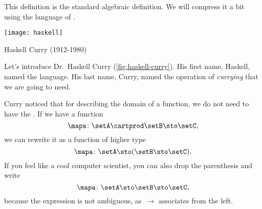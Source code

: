 This definition is the standard algebraic definition.
We will compress it a bit using the language of .

\begin{marginfigure}
    \texttt{[image: haskell]}
    \caption{Haskell Curry (1912-1980)}
    \label{fig:haskell-curry}
\end{marginfigure}

Let's introduce Dr.~Haskell Curry (\cref{fig:haskell-curry}).
His first name, Haskell, named the language.
His last name, Curry, named the operation of \emph{currying} that we are going to need.

Curry noticed that for describing the domain of a function, we do not need to have the .
If we have a function
%
\begin{equation}
    \label{eq:currying-1}
    \mapa \colon \setA \cartprod \setB \sto \setC,
\end{equation}
%
we can rewrite it as a function of higher type
%
\begin{equation}
    \label{eq:currying-2}
    \mapa \colon \setA \sto ( \setB \sto \setC).
\end{equation}
%
If you feel like a cool computer scientist, you can also drop the parenthesis and write
%
\begin{equation}
    \label{eq:currying-3}
    \mapa \colon \setA \sto \setB \sto \setC,
\end{equation}
%
because the expression is not ambiguous, as~$\to$ associates from the left.


